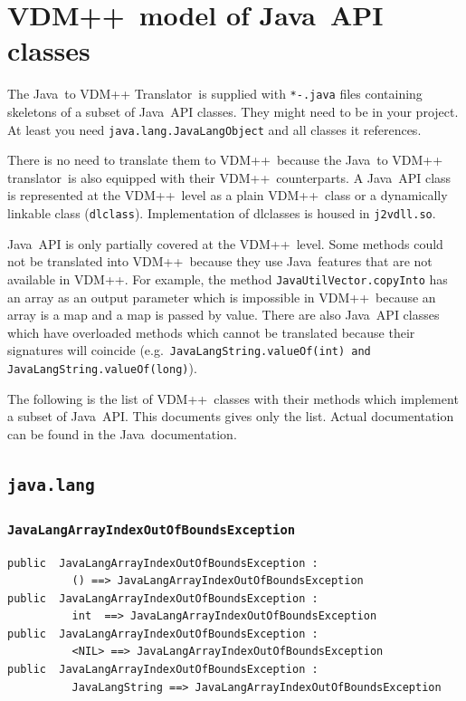 \documentclass[\pformat,12pt]{article}
\newcommand{\JAVA}{Java}
\newcommand{\tjTov}{the \JAVA\ to VDM++ translator}
\newcommand{\TjTov}{The \JAVA\ to VDM++ Translator}
\newcommand{\VDM}{VDM++}
\begin{document}
\newpage
\section{\VDM\ model of \JAVA\ API classes}\label{javaapi}

\TjTov\ is supplied with \texttt{*-.java} files containing skeletons of a subset of 
\JAVA\ API classes. They might need to be in your project.
At least you need \texttt{java.lang.JavaLangObject} and all classes it references.

There is no need to translate them to \VDM\ because \tjTov\ is
also equipped with their \VDM\ counterparts. 
A \JAVA\ API class is represented at the \VDM\ level as a
plain \VDM\ class or a dynamically linkable class (\texttt{dlclass}).
Implementation of dlclasses is housed in \texttt{j2vdll.so}.

\JAVA\ API is only partially covered at the \VDM\ level. 
Some methods could not be translated into \VDM\
because they use \JAVA\ features that are not available in \VDM{}.
For example, the method \texttt{JavaUtilVector.copyInto} has an array
as an output parameter which is impossible in \VDM\ because an array
is a map and a map is passed by value. There are also \JAVA\ API
classes which have overloaded methods which cannot be translated
because their signatures will coincide (e.g.\
\texttt{JavaLangString.valueOf(int) and
  JavaLangString.valueOf(long)}). 

The following is the list of \VDM\ classes with their methods
which implement a subset of \JAVA\ API.
This documents gives only the list.
Actual documentation can be found in the \JAVA\ documentation.

\subsection{\texttt{java.lang}}

\subsubsection{\texttt{JavaLangArrayIndexOutOfBoundsException}}
\begin{small}
\begin{verbatim}
public  JavaLangArrayIndexOutOfBoundsException : 
          () ==> JavaLangArrayIndexOutOfBoundsException
public  JavaLangArrayIndexOutOfBoundsException : 
          int  ==> JavaLangArrayIndexOutOfBoundsException
public  JavaLangArrayIndexOutOfBoundsException : 
          <NIL> ==> JavaLangArrayIndexOutOfBoundsException
public  JavaLangArrayIndexOutOfBoundsException : 
          JavaLangString ==> JavaLangArrayIndexOutOfBoundsException
\end{verbatim}
\end{small}
\end{document}
